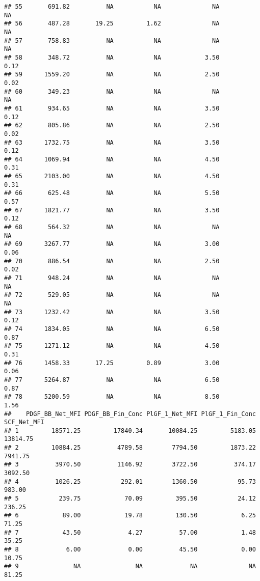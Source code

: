\documentclass[]{article}
\begin{document}
\begin{verbatim}
## 55       691.82          NA           NA              NA               NA
## 56       487.28       19.25         1.62              NA               NA
## 57       758.83          NA           NA              NA               NA
## 58       348.72          NA           NA            3.50             0.12
## 59      1559.20          NA           NA            2.50             0.02
## 60       349.23          NA           NA              NA               NA
## 61       934.65          NA           NA            3.50             0.12
## 62       805.86          NA           NA            2.50             0.02
## 63      1732.75          NA           NA            3.50             0.12
## 64      1069.94          NA           NA            4.50             0.31
## 65      2103.00          NA           NA            4.50             0.31
## 66       625.48          NA           NA            5.50             0.57
## 67      1821.77          NA           NA            3.50             0.12
## 68       564.32          NA           NA              NA               NA
## 69      3267.77          NA           NA            3.00             0.06
## 70       886.54          NA           NA            2.50             0.02
## 71       948.24          NA           NA              NA               NA
## 72       529.05          NA           NA              NA               NA
## 73      1232.42          NA           NA            3.50             0.12
## 74      1834.05          NA           NA            6.50             0.87
## 75      1271.12          NA           NA            4.50             0.31
## 76      1458.33       17.25         0.89            3.00             0.06
## 77      5264.87          NA           NA            6.50             0.87
## 78      5200.59          NA           NA            8.50             1.56
##    PDGF_BB_Net_MFI PDGF_BB_Fin_Conc PlGF_1_Net_MFI PlGF_1_Fin_Conc SCF_Net_MFI
## 1         18571.25         17840.34       10084.25         5183.05    13814.75
## 2         10884.25          4789.58        7794.50         1873.22     7941.75
## 3          3970.50          1146.92        3722.50          374.17     3092.50
## 4          1026.25           292.01        1360.50           95.73      983.00
## 5           239.75            70.09         395.50           24.12      236.25
## 6            89.00            19.78         130.50            6.25       71.25
## 7            43.50             4.27          57.00            1.48       35.25
## 8             6.00             0.00          45.50            0.00       10.75
## 9               NA               NA             NA              NA       81.25

\end{verbatim}
\end{document}
